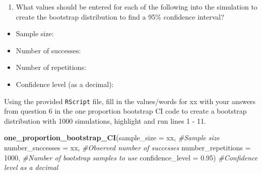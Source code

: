 \documentclass[
]{report}
\newenvironment{Shaded}{\begin{snugshade}}{\end{snugshade}}
\newcommand{\CommentTok}[1]{\textcolor[rgb]{0.56,0.35,0.01}{\textit{#1}}}
\newcommand{\DataTypeTok}[1]{\textcolor[rgb]{0.13,0.29,0.53}{#1}}
\newcommand{\DecValTok}[1]{\textcolor[rgb]{0.00,0.00,0.81}{#1}}
\newcommand{\FloatTok}[1]{\textcolor[rgb]{0.00,0.00,0.81}{#1}}
\newcommand{\KeywordTok}[1]{\textcolor[rgb]{0.13,0.29,0.53}{\textbf{#1}}}
\newcommand{\NormalTok}[1]{#1}
\providecommand{\tightlist}{%
  \setlength{\itemsep}{0pt}\setlength{\parskip}{0pt}}
\begin{document}
\begin{enumerate}
\def\labelenumi{\arabic{enumi}.}
\setcounter{enumi}{5}
\tightlist
\item
  What values should be entered for each of the following into the simulation to create the bootstrap distribution to find a 95\% confidence interval?
  \vspace{1mm}
\end{enumerate}

\begin{itemize}
\tightlist
\item
  Sample size:
\end{itemize}

\vspace{.1in}

\begin{itemize}
\tightlist
\item
  Number of successes:
\end{itemize}

\vspace{.1in}

\begin{itemize}
\tightlist
\item
  Number of repetitions:
\end{itemize}

\vspace{.1in}

\begin{itemize}
\tightlist
\item
  Confidence level (as a decimal):
\end{itemize}

\vspace{.1in}

Using the provided \texttt{RScript} file, fill in the values/words for xx with your answers from question 6 in the one proportion bootstrap CI code to create a bootstrap distribution with 1000 simulations, highlight and run lines 1 - 11.

\begin{Shaded}
\begin{Highlighting}[]
\KeywordTok{one\_proportion\_bootstrap\_CI}\NormalTok{(}\DataTypeTok{sample\_size =}\NormalTok{ xx, }\CommentTok{\#Sample size}
                    \DataTypeTok{number\_successes =}\NormalTok{ xx, }\CommentTok{\#Observed number of successes}
                    \DataTypeTok{number\_repetitions =} \DecValTok{1000}\NormalTok{, }\CommentTok{\#Number of bootstrap samples to use}
                    \DataTypeTok{confidence\_level =} \FloatTok{0.95}\NormalTok{) }\CommentTok{\#Confidence level as a decimal}
\end{Highlighting}
\end{Shaded}
\end{document}
